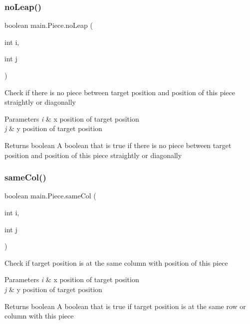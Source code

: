 \subsubsection{\texorpdfstring{noLeap()}{noLeap()}}
{\footnotesize\ttfamily boolean main.\+Piece.\+no\+Leap (\begin{DoxyParamCaption}\item[{int}]{i,  }\item[{int}]{j }\end{DoxyParamCaption})\hspace{0.3cm}{\ttfamily [inline]}}

Check if there is no piece between target position and position of this piece straightly or diagonally 
\begin{DoxyParams}{Parameters}
{\em i} & x position of target position \\
\hline
{\em j} & y position of target position \\
\hline
\end{DoxyParams}
\begin{DoxyReturn}{Returns}
boolean A boolean that is true if there is no piece between target position and position of this piece straightly or diagonally 
\end{DoxyReturn}
\mbox{\label{classmain_1_1_piece_a5dff87dbb6683e90c752b29c0b1dd5b4}} 
\subsubsection{\texorpdfstring{sameCol()}{sameCol()}}
{\footnotesize\ttfamily boolean main.\+Piece.\+same\+Col (\begin{DoxyParamCaption}\item[{int}]{i,  }\item[{int}]{j }\end{DoxyParamCaption})\hspace{0.3cm}{\ttfamily [inline]}}

Check if target position is at the same column with position of this piece 
\begin{DoxyParams}{Parameters}
{\em i} & x position of target position \\
\hline
{\em j} & y position of target position \\
\hline
\end{DoxyParams}
\begin{DoxyReturn}{Returns}
boolean A boolean that is true if target position is at the same row or column with this piece 
\end{DoxyReturn}
\mbox{\label{classmain_1_1_piece_ad00cbb2f2d2fc267a39bfb839b8b56ac}} 

